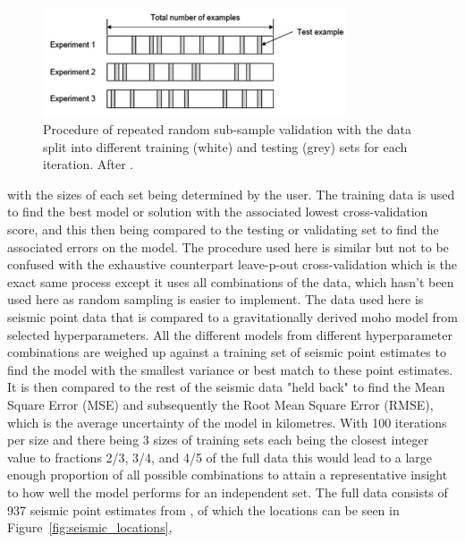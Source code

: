 \begin{figure}[h]
  \begin{center}
    \includegraphics[width=0.8\textwidth]{figures/RRSSV}
  \end{center}
  \caption{
   Procedure of repeated random sub-sample validation with the data split into different training (white) and testing (grey) sets for each iteration. After \cite{unknown}.
  }
  \label{fig:RRSSV}
\end{figure}
with the sizes of each set being determined by the user. The training data is used to find the best model or solution with the associated lowest cross-validation score, and this then being compared to the testing or validating set to find the associated errors on the model. The procedure used here is similar but not to be confused with the exhaustive counterpart leave-p-out cross-validation which is the exact same process except it uses all combinations of the data, which hasn't been used here as random sampling is easier to implement. The data used here is seismic point data that is compared to a gravitationally derived moho model from selected hyperparameters. All the different models from different hyperparameter combinations are weighed up against a training set of seismic point estimates to find the model with the smallest variance or best match to these point estimates. It is then compared to the rest of the seismic data "held back" to find the Mean Square Error (MSE) and subsequently the Root Mean Square Error (RMSE), which is the average uncertainty of the model in kilometres. With 100 iterations per size and there being 3 sizes of training sets each being the closest integer value to fractions 2/3, 3/4, and 4/5 of the full data this would lead to a large enough proportion of all possible combinations to attain a representative insight to how well the model performs for an independent set. The full data consists of 937 seismic point estimates from \cite{Assumpo2013}, of which the locations can be seen in Figure~\ref{fig:seismic_locations},
